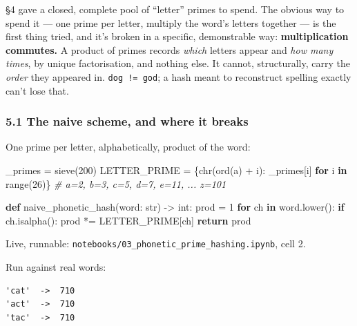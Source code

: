 \documentclass[
  10pt,
]{article}
\newenvironment{Shaded}{}{}
\newcommand{\BuiltInTok}[1]{\textcolor[rgb]{0.00,0.50,0.00}{#1}}
\newcommand{\CommentTok}[1]{\textcolor[rgb]{0.38,0.63,0.69}{\textit{#1}}}
\newcommand{\ControlFlowTok}[1]{\textcolor[rgb]{0.00,0.44,0.13}{\textbf{#1}}}
\newcommand{\DecValTok}[1]{\textcolor[rgb]{0.25,0.63,0.44}{#1}}
\newcommand{\KeywordTok}[1]{\textcolor[rgb]{0.00,0.44,0.13}{\textbf{#1}}}
\newcommand{\NormalTok}[1]{#1}
\newcommand{\OperatorTok}[1]{\textcolor[rgb]{0.40,0.40,0.40}{#1}}
\newcommand{\StringTok}[1]{\textcolor[rgb]{0.25,0.44,0.63}{#1}}
\begin{document}
§4 gave a closed, complete pool of ``letter'' primes to spend. The
obvious way to spend it --- one prime per letter, multiply the word's
letters together --- is the first thing tried, and it's broken in a
specific, demonstrable way: \textbf{multiplication commutes.} A product
of primes records \emph{which} letters appear and \emph{how many times},
by unique factorisation, and nothing else. It cannot, structurally,
carry the \emph{order} they appeared in.
\texttt{\textquotesingle{}dog\textquotesingle{}\ !=\ \textquotesingle{}god\textquotesingle{}};
a hash meant to reconstruct spelling exactly can't lose that.

\hypertarget{the-naive-scheme-and-where-it-breaks}{%
\subsubsection{5.1 The naive scheme, and where it
breaks}\label{the-naive-scheme-and-where-it-breaks}}

One prime per letter, alphabetically, product of the word:

\begin{Shaded}
\begin{Highlighting}[]
\NormalTok{\_primes }\OperatorTok{=}\NormalTok{ sieve(}\DecValTok{200}\NormalTok{)}
\NormalTok{LETTER\_PRIME }\OperatorTok{=}\NormalTok{ \{}\BuiltInTok{chr}\NormalTok{(}\BuiltInTok{ord}\NormalTok{(}\StringTok{\textquotesingle{}a\textquotesingle{}}\NormalTok{) }\OperatorTok{+}\NormalTok{ i): \_primes[i] }\ControlFlowTok{for}\NormalTok{ i }\KeywordTok{in} \BuiltInTok{range}\NormalTok{(}\DecValTok{26}\NormalTok{)\}}
\CommentTok{\# a=2, b=3, c=5, d=7, e=11, ... z=101}

\KeywordTok{def}\NormalTok{ naive\_phonetic\_hash(word: }\BuiltInTok{str}\NormalTok{) }\OperatorTok{{-}\textgreater{}} \BuiltInTok{int}\NormalTok{:}
\NormalTok{    prod }\OperatorTok{=} \DecValTok{1}
    \ControlFlowTok{for}\NormalTok{ ch }\KeywordTok{in}\NormalTok{ word.lower():}
        \ControlFlowTok{if}\NormalTok{ ch.isalpha():}
\NormalTok{            prod }\OperatorTok{*=}\NormalTok{ LETTER\_PRIME[ch]}
    \ControlFlowTok{return}\NormalTok{ prod}
\end{Highlighting}
\end{Shaded}

Live, runnable: \texttt{notebooks/03\_phonetic\_prime\_hashing.ipynb},
cell 2.

Run against real words:

\begin{verbatim}
'cat'  ->  710
'act'  ->  710
'tac'  ->  710
\end{verbatim}
\end{document}
